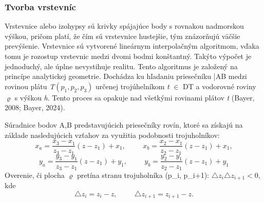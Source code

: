 \documentclass[12pt]{article}
\begin{document}
\subsubsection*{Tvorba vrstevníc}
Vrstevnice alebo izohypsy sú krivky spájajúce body s rovnakou nadmorskou výškou, pričom platí, že čím sú vrstevnice hustejšie, tým znázorňujú väčšie prevýšenie. Vrstevnice sú vytvorené lineárnym interpolačným algoritmom, vďaka tomu je rozostup vrstevnic medzi dvomi bodmi konštantný. Takýto výpočet je jednoduchý, ale úplne nevystihuje realitu. Tento algoritmus je založený na princípe analytickej geometrie. Dochádza ku hľadaniu priesečníku \bar{AB} medzi rovinou plátu \textit{T}$(p_1, p_2, p_3)$ určenej trojúhelníkom \textit{t} $\in$ DT a vodorovné roviny $\varrho$  s výškou \textit{h}. Tento proces sa opakuje nad  všetkými rovinami plátov \textit{t} (Bayer, 2008; Bayer, 2024). \par\newpage
Súradnice bodov A,B predstavujúcich priesečníky rovín, ktoré sa získajú na základe nasledujúcich vzťahov za využitia podobnosti trojuholníkov:
$$ x_a = \frac{x_3 - x_1}{z_3 - z_1}(z - z_1) + x_1,\hspace{1cm}  x_b = \frac{x_2 - x_1}{z_2 - z_1}(z - z_1) + x_1,$$
$$ y_a = \frac{y_3 - y_1}{z_3 - z_1}(z - z_1) + y_1,\hspace{1cm}  y_b = \frac{y_2 - y_1}{z_2 - z_1}(z - z_1) + y_1 $$
Overenie, či plocha $\varrho$ pretína stranu trojuholníka (p_i, p_{i+1}): $ \triangle z_i \triangle z_{i+1}<0$, kde $$\triangle z_i = z_i - z, \hspace{1cm}  \triangle z_{i+1} = z_{i+1} - z.$$
\end{document}
